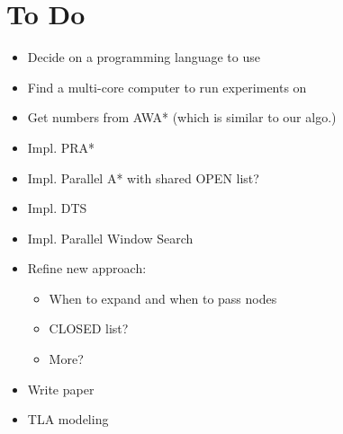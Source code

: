 \documentclass{article}
\begin{document}
\section{To Do}

\begin{itemize}
\item Decide on a programming language to use
\item Find a multi-core computer to run experiments on
\item Get numbers from AWA* (which is similar to our algo.)
\item Impl. PRA*
\item Impl. Parallel A* with shared OPEN list?
\item Impl. DTS
\item Impl. Parallel Window Search
\item Refine new approach:
  \begin{itemize}
  \item When to expand and when to pass nodes
  \item CLOSED list?
  \item More?
  \end{itemize}
\item Write paper
\item TLA modeling
\end{itemize}
\end{document}
